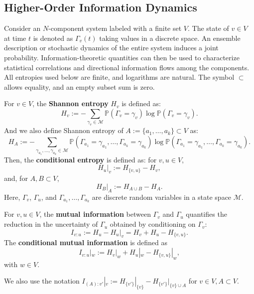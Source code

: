 \documentclass{comnet}%
\begin{document}
\subsection{\label{sec:Defs_InfoDyn} Higher-Order Information Dynamics}
Consider an $N$-component system labeled with a finite set $V$. The state of $v \in V$ at time $t$ is denoted as $\Gamma_{v}(t)$ taking values in a discrete space. An ensemble description or stochastic dynamics of the entire system induces a joint probability. Information-theoretic quantities can then be used to characterize statistical correlations and directional information flows among the components. All entropies used below are finite, and logarithms are natural. The symbol $\subset$ allows equality, and an empty subset sum is zero.
\begin{definition}
	For $v \in V$, the \textbf{Shannon entropy} $H_{v}$ \cite{Shannon1949, Cover1991} is defined as:
	\begin{equation}
			H_{v} := - \sum_{\gamma_{v} \in \mathcal{M}} \mathbb{P}(\Gamma_{v} = \gamma_{v}) \log \mathbb{P}(\Gamma_{v} = \gamma_{v}).
	\end{equation}
	And we also define Shannon entropy of $A := \{a_1, \dots, a_k \} \subset V$ as:
	\begin{equation}
			H_{A} := - \sum_{\gamma_{a_{1}}, \dots, \gamma_{a_{k}} \in \mathcal{M}} \mathbb{P}(\Gamma_{a_{1}} = \gamma_{a_{1}}, \dots, \Gamma_{a_{k}} = \gamma_{a_{k}}) \log \mathbb{P}(\Gamma_{a_{1}} = \gamma_{a_{1}}, \dots, \Gamma_{a_{k}} = \gamma_{a_{k}}).
	\end{equation}
	Then, the \textbf{conditional entropy} is defined as: for $v, u \in V$,
	\begin{equation}
			H_{u}|_{v} := H_{\{v,u\}} - H_{v},
	\end{equation}
	and, for $A, B \subset V$,
	\begin{equation}
			H_{B}|_{A} := H_{A \cup B} - H_{A}.	\end{equation}
	Here, $\Gamma_{v}$, $\Gamma_{u}$, and $\Gamma_{a_{1}}, \dots, \Gamma_{a_{k}}$ are discrete random variables in a state space $\mathcal{M}$.\\
\end{definition}

\begin{definition}
	For $v, u \in V$, the \textbf{mutual information} \cite{Cover1991} between $\Gamma_{v}$ and $\Gamma_{u}$ quantifies the reduction in the uncertainty of $\Gamma_{u}$ obtained by conditioning on $\Gamma_{v}$:\\
	\begin{equation}
		I_{v:u} := H_{u} - H_{u}|_{v} = H_{v} + H_{u} - H_{\{v, u\}}.
	\end{equation}
	The \textbf{conditional mutual information} is defined as\\
	\begin{equation}
		I_{v:u}|_{w} := H_{v}|_{w} + H_{u}|_{w} - H_{\{v, u\}}|_{w},
	\end{equation}
	with $w \in V$.
\end{definition}
We also use the notation $I_{(A) : v'}|_{v} := H_{\{v'\}}|_{\{v\}} - H_{\{v'\}}|_{\{v\} \cup A}$ for $v \in V, A \subset V$.\\
\end{document}
